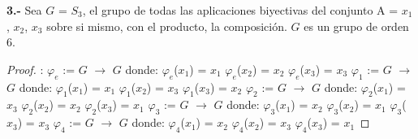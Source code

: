 \documentclass[10pt,a4paper,oneside]{article}
\begin{document}
			\newline
			\newline
			\textbf{3.-} Sea $G$ = $S_{3}$, el grupo de todas las aplicaciones biyectivas del conjunto A = {$x_{1}$, $x_{2}$, $x_{3}$} sobre si mismo, con el producto, la composición. $G$ es un grupo de orden 6.
			\begin{proof}:
				\newline
				\newline
				$\varphi_{e}$ := $G$ $\rightarrow$ $G$ donde:
				\newline
				$\varphi_{e}$($x_{1}$) = $x_{1}$
				\newline
				$\varphi_{e}$($x_{2}$) = $x_{2}$
				\newline
				$\varphi_{e}$($x_{3}$) = $x_{3}$
				\newline
				\newline
				$\varphi_{1}$ := $G$ $\rightarrow$ $G$ donde:
				\newline
				$\varphi_{1}$($x_{1}$) = $x_{1}$
				\newline
				$\varphi_{1}$($x_{2}$) = $x_{3}$
				\newline
				$\varphi_{1}$($x_{3}$) = $x_{2}$
				\newline
				\newline
				$\varphi_{2}$ := $G$ $\rightarrow$ $G$ donde:
				\newline
				$\varphi_{2}$($x_{1}$) = $x_{3}$
				\newline
				$\varphi_{2}$($x_{2}$) = $x_{2}$
				\newline
				$\varphi_{2}$($x_{3}$) = $x_{1}$
				\newline
				\newline
				$\varphi_{3}$ := $G$ $\rightarrow$ $G$ donde:
				\newline
				$\varphi_{3}$($x_{1}$) = $x_{2}$
				\newline
				$\varphi_{3}$($x_{2}$) = $x_{1}$
				\newline
				$\varphi_{3}$($x_{3}$) = $x_{3}$
				\newline
				\newline
				$\varphi_{4}$ := $G$ $\rightarrow$ $G$ donde:
				\newline
				$\varphi_{4}$($x_{1}$) = $x_{2}$
				\newline
				$\varphi_{4}$($x_{2}$) = $x_{3}$
				\newline
				$\varphi_{4}$($x_{3}$) = $x_{1}$
				\newline
				\newline

\end{proof}
\end{document}

